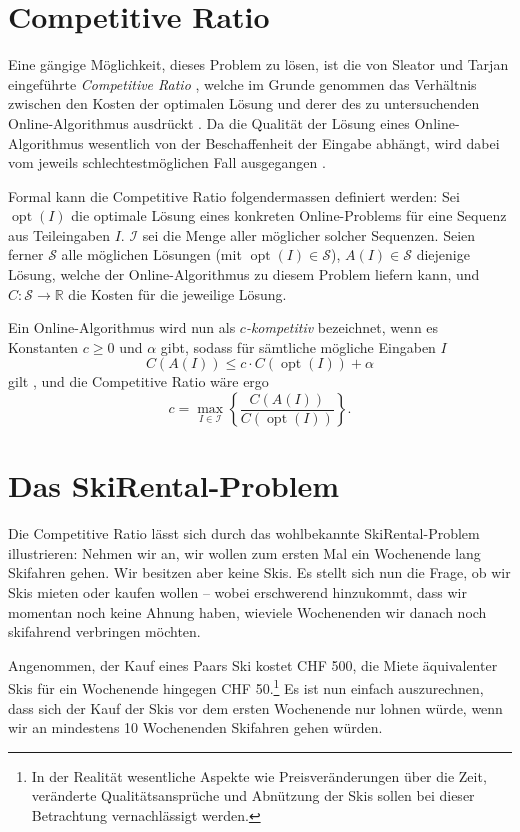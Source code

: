 \documentclass[11pt,abstracton]{scrreprt} %
\theoremstyle{definition}
\begin{document}
\section{Competitive Ratio}

Eine gängige Möglichkeit, dieses Problem zu lösen, ist die von Sleator und Tarjan eingeführte {\it Competitive Ratio} \cite{Sleator, BKK}, welche im Grunde genommen das Verhältnis zwischen den Kosten der optimalen Lösung und derer des zu untersuchenden Online-Algorithmus ausdrückt \cite{BKK}. Da die Qualität der Lösung eines Online-Algorithmus wesentlich von der Beschaffenheit der Eingabe abhängt, wird dabei vom jeweils schlechtestmöglichen Fall ausgegangen \cite{Trevisan}.

\bigskip
Formal kann die Competitive Ratio folgendermassen definiert werden: Sei $\operatorname{opt}(I)$ die optimale Lösung eines konkreten Online-Problems für eine Sequenz aus Teileingaben $I$. $\mathcal{I}$ sei die Menge aller möglicher solcher Sequenzen. Seien ferner $\mathcal{S}$ alle möglichen Lösungen (mit $\operatorname{opt}(I) \in \mathcal{S}$), $A(I) \in \mathcal{S}$ diejenige Lösung, welche der Online-Algorithmus zu diesem Problem liefern kann, und $C : \mathcal{S} \rightarrow \mathbb{R}$ die Kosten für die jeweilige Lösung.

\bigskip
Ein Online-Algorithmus wird nun als {\it $c$-kompetitiv} bezeichnet, wenn es Konstanten $c \ge 0$ und $\alpha$ gibt, sodass für sämtliche mögliche Eingaben $I$
\[
C(A(I)) \le c\cdot C(\operatorname{opt}(I)) + \alpha
\]
gilt \cite{BKK}, und die Competitive Ratio wäre ergo
\[
c = \max_{I \in \mathcal{I}} \left\{ \frac {C(A(I))}{C(\operatorname{opt}(I))} \right\}.
\]

\section{Das {\sc SkiRental}-Problem}

Die Competitive Ratio lässt sich durch das wohlbekannte {\sc SkiRental}-Problem illustrieren: Nehmen wir an, wir wollen zum ersten Mal ein Wochenende lang Skifahren gehen. Wir besitzen aber keine Skis. Es stellt sich nun die Frage, ob wir Skis mieten oder kaufen wollen -- wobei erschwerend hinzukommt, dass wir momentan noch keine Ahnung haben, wieviele Wochenenden wir danach noch skifahrend verbringen möchten.

Angenommen, der Kauf eines Paars Ski kostet CHF 500, die Miete äquivalenter Skis für ein Wochenende hingegen CHF 50.\footnote{In der Realität wesentliche Aspekte wie Preisveränderungen über die Zeit, veränderte Qualitätsansprüche und Abnützung der Skis sollen bei dieser Betrachtung vernachlässigt werden.} Es ist nun einfach auszurechnen, dass sich der Kauf der Skis vor dem ersten Wochenende nur lohnen würde, wenn wir an mindestens 10 Wochenenden Skifahren gehen würden.
\end{document}
